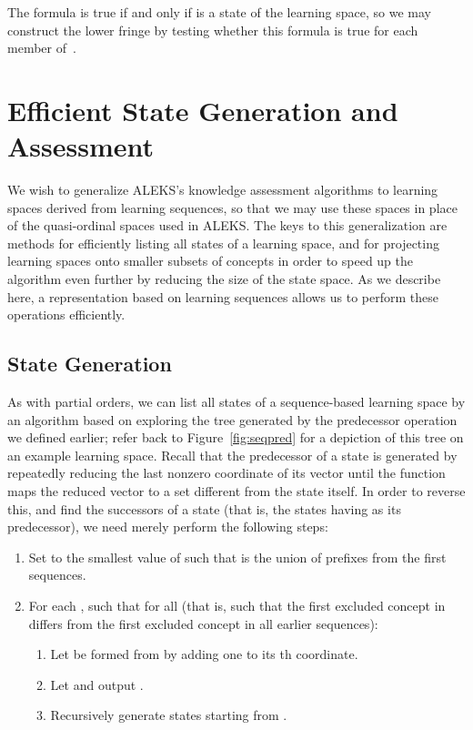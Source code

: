 \documentclass[11pt]{llncs}
\begin{document}
{The formula  is true if and only if  is a state of the learning space, so we may construct the lower fringe by testing whether this formula is true for each member  of~.

\section{Efficient State Generation and Assessment}

We wish to generalize ALEKS's knowledge assessment algorithms to learning spaces derived from learning sequences, so that we may use these spaces in place of the quasi-ordinal spaces used in ALEKS. The keys to this generalization are methods for efficiently listing all states of a learning space, and for projecting learning spaces onto smaller subsets of concepts in order to speed up the algorithm even further by reducing the size of the state space. As we describe here, a representation based on learning sequences allows us to perform these operations efficiently.

\subsection{State Generation}

As with partial orders, we can list all states of a sequence-based learning space by an algorithm based on exploring the tree generated by the predecessor operation we defined earlier; refer back to Figure~\ref{fig:seqpred} for a depiction of this tree on an example learning space.
Recall that the predecessor of a state is generated by repeatedly reducing the last nonzero coordinate of its  vector until the  function maps the reduced vector to a set different from the state itself. In order to reverse this, and find the successors of a state  (that is, the states having  as its predecessor), we need merely perform the following steps:

\begin{enumerate}
\item Set  to the smallest value of  such that  is the union of prefixes from the first  sequences.
\item For each , such that  for all 
(that is, such that the first excluded concept in  differs from the first excluded
concept in all earlier sequences):
\begin{enumerate}
\item Let  be formed from  by adding one to its th coordinate.
\item Let  and output .
\item Recursively generate states starting from .
\end{enumerate}
\end{enumerate}

}
\end{document}
